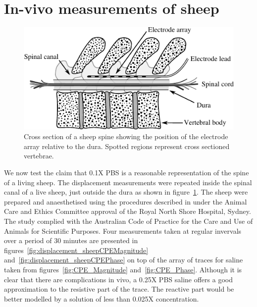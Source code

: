 \documentclass[journal, a4paper]{IEEEtran}
\begin{document}
\section{In-vivo measurements of sheep}

\begin{figure}
    \begin{center}
        \includegraphics{graphics/sheepSpine}
    \end{center}
    \caption{Cross section of a sheep spine showing the position of the electrode array relative to the dura. Spotted regions represent cross sectioned vertebrae.}
    \label{fig:sheepSpine}
\end{figure}

We now test the claim that 0.1X PBS is a reasonable representation of the spine of a living sheep.
The displacement measurements were repeated inside the spinal canal of a live sheep, just outside the dura as shown in figure~\ref{fig:sheepSpine}. The sheep were prepared and anaesthetised using the procedures described in \cite{Parker2013} under the Animal Care and Ethics Committee approval of the Royal North Shore Hospital, Sydney. The study complied with the Australian Code of Practice for the Care and Use of Animals for Scientific Purposes.
{\color{blue} Four measurements taken at regular invervals over a period of 30 minutes} are presented in figures~\ref{fig:displacement_sheepCPEMagnitude} and~\ref{fig:displacement_sheepCPEPhase} on top of the array of traces for saline taken from figures~\ref{fig:CPE_Magnitude} and~\ref{fig:CPE_Phase}.
Although it is clear that there are complications in vivo, a 0.25X PBS saline offers a good approximation to the resistive part of the trace.
The reactive part would be better modelled by a solution of less than 0.025X concentration.
\end{document}
